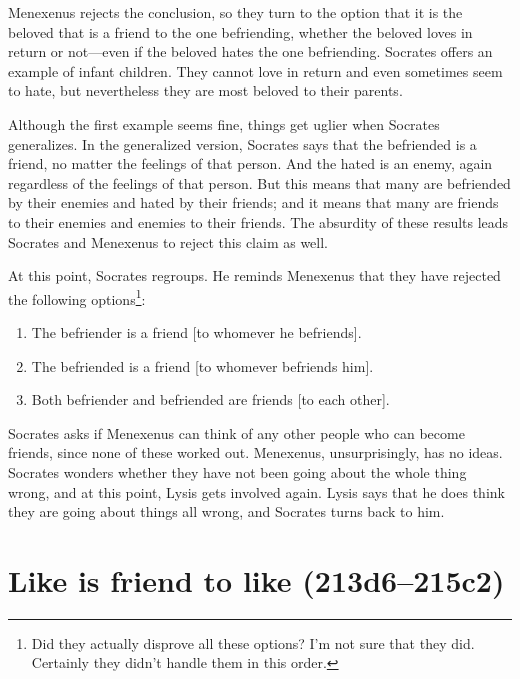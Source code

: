 \documentclass[11pt]{article}
\begin{document}
Menexenus rejects the conclusion, so they turn to the option that it is the
beloved that is a friend to the one befriending, whether the beloved loves in
return or not---even if the beloved hates the one befriending.  Socrates offers
an example of infant children.  They cannot love in return and even sometimes
seem to hate, but nevertheless they are most beloved to their parents.

Although the first example seems fine, things get uglier when Socrates
generalizes.  In the generalized version, Socrates says that the befriended is
a friend, no matter the feelings of that person. And the hated is an enemy,
again regardless of the feelings of that person.  But this means that many are
befriended by their enemies and hated by their friends; and it means that many
are friends to their enemies and enemies to their friends.  The absurdity of
these results leads Socrates and Menexenus to reject this claim as well.

At this point, Socrates regroups.  He reminds Menexenus that they have rejected
the following options\footnote{Did they actually disprove all these options?
I'm not sure that they did.  Certainly they didn't handle them in this order.}:

\begin{enumerate}

    \item The befriender is a friend [to whomever he befriends].

    \item The befriended is a friend [to whomever befriends him].

    \item Both befriender and befriended are friends [to each other].

\end{enumerate}

Socrates asks if Menexenus can think of any other people who can become
friends, since none of these worked out.  Menexenus, unsurprisingly, has no
ideas.  Socrates wonders whether they have not been going about the whole thing
wrong, and at this point, Lysis gets involved again.  Lysis says that he does
think they are going about things all wrong, and Socrates turns back to him.


\section{Like is friend to like (213d6--215c2)}
\end{document}

